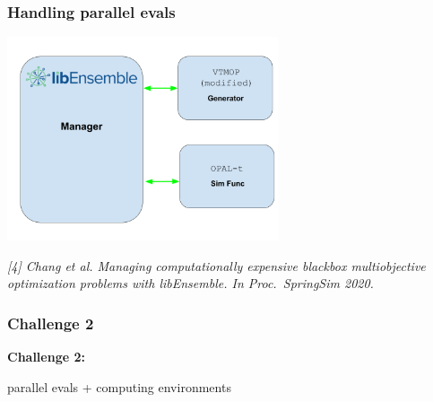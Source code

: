 \documentclass[aspectratio=169]{beamer}
\begin{document}
\begin{frame}\frametitle{Handling parallel evals}

\begin{center}
\includegraphics[width=0.6\textwidth]{../img/moo_old/vtmop_libe_diagram.png}\\
\end{center}

\vfill

{\tiny\it
[4] Chang et al.
Managing computationally expensive blackbox multiobjective optimization
problems with libEnsemble.
{\sl In Proc.\ SpringSim 2020.}\\
}

\end{frame}

\begin{frame}\frametitle{Challenge 2}
\vfill
\begin{center}
{\Huge \bf
Challenge 2:\\

\bigskip

parallel evals + computing environments
}
\end{center}
\vfill
\end{frame}
\end{document}
